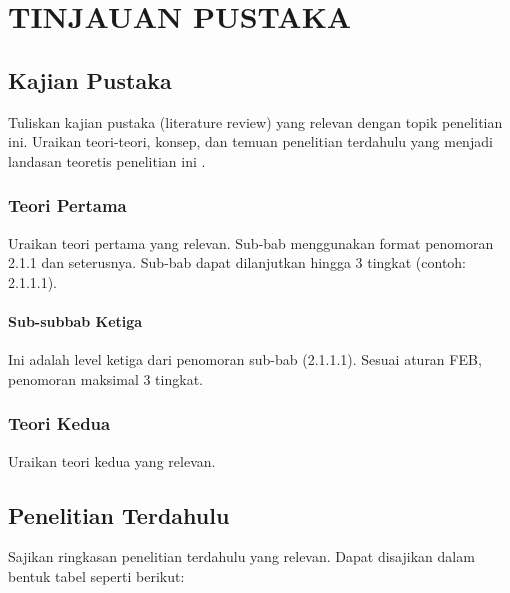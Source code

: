 
\chapter{TINJAUAN PUSTAKA}
\label{bab:tinjauan-pustaka}

\section{Kajian Pustaka}
\label{sec:kajian-pustaka}

Tuliskan kajian pustaka (literature review) yang relevan dengan topik penelitian ini.
Uraikan teori-teori, konsep, dan temuan penelitian terdahulu yang menjadi landasan
teoretis penelitian ini \cite{contohSumber2025}.

\subsection{Teori Pertama}
\label{subsec:teori-pertama}

Uraikan teori pertama yang relevan. Sub-bab menggunakan format penomoran 2.1.1 dan
seterusnya. Sub-bab dapat dilanjutkan hingga 3 tingkat (contoh: 2.1.1.1).

\subsubsection{Sub-subbab Ketiga}
\label{subsubsec:sub-subbab-ketiga}

Ini adalah level ketiga dari penomoran sub-bab (2.1.1.1). Sesuai aturan FEB,
penomoran maksimal 3 tingkat.

\subsection{Teori Kedua}
\label{subsec:teori-kedua}

Uraikan teori kedua yang relevan.

\section{Penelitian Terdahulu}
\label{sec:penelitian-terdahulu}

Sajikan ringkasan penelitian terdahulu yang relevan. Dapat disajikan dalam bentuk
tabel seperti berikut:

